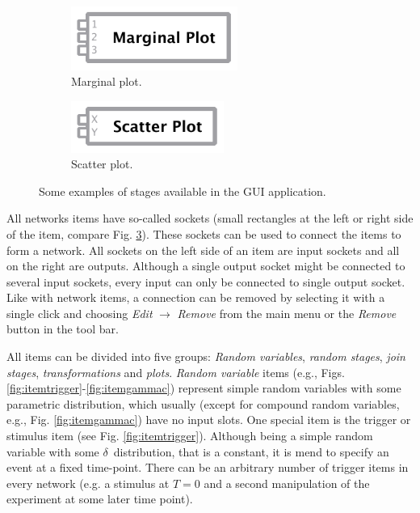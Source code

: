 \begin{figure}[!ht]
  \begin{subfigure}[c]{0.4\textwidth}
    \centering
 	\includegraphics[width=0.6\textwidth]{fig/guiplot.pdf}
 	\caption{Marginal plot.} \label{fig:itemplot}
 \end{subfigure}\hfill
  \begin{subfigure}[c]{0.4\textwidth}
    \centering
 	\includegraphics[width=0.55\textwidth]{fig/guiscatter.pdf}
 	\caption{Scatter plot.} \label{fig:itemscatter}
 \end{subfigure}
 \caption{Some examples of stages available in the GUI application.} \label{fig:items}
\end{figure}

All networks items have so-called sockets (small rectangles at the left or right side of the item, compare Fig. \ref{fig:items}). These sockets can be used to connect the items to form a network. All sockets on the left side of an item are input sockets and all on the right are outputs. Although a single output socket might be connected to several input sockets, every input can only be connected to single output socket. Like with network items, a connection can be removed by selecting it with a single click and choosing \emph{Edit} $\rightarrow$ \emph{Remove} from the main menu or the \emph{Remove} button in the tool bar.

All items can be divided into five groups: \emph{Random variables}, \emph{random stages}, \emph{join stages}, \emph{transformations} and \emph{plots}. \emph{Random variable} items (e.g., Figs. \ref{fig:itemtrigger}-\ref{fig:itemgammac}) represent simple random variables with some parametric distribution, which usually (except for compound random variables, e.g., Fig. \ref{fig:itemgammac}) have no input slots. One special item is the trigger or stimulus item (see Fig. \ref{fig:itemtrigger}). Although being a simple random variable with some $\delta$~distribution, that is a constant, it is mend to specify an event at a fixed time-point. There can be an arbitrary number of trigger items in every network (e.g. a stimulus at $T=0$ and a second manipulation of the experiment at some later time point).

